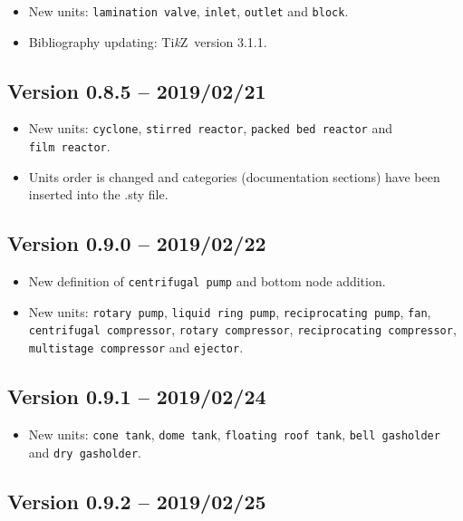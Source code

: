 \documentclass[12pt]{article}						%
\newcommand*{\chpp}[1]{\texttt{#1}}				%
\newcommand*{\TikZ}{Ti\textit{k}Z}
\begin{document}
\begin{itemize}
	\item New units: \chpp{lamination valve}, \chpp{inlet}, \chpp{outlet} and
		\chpp{block}.
	\item Bibliography updating: \TikZ\ version 3.1.1.
\end{itemize}

\subsection*{Version 0.8.5 -- 2019/02/21}

\begin{itemize}
	\item New units: \chpp{cyclone}, \chpp{stirred reactor},
		\chpp{packed bed reactor} and\\
		\chpp{film reactor}.
	\item Units order is changed and categories (documentation sections) have
		been inserted into the .sty file.
\end{itemize}

\subsection*{Version 0.9.0 -- 2019/02/22}

\begin{itemize}
	\item New definition of \chpp{centrifugal pump} and bottom node addition.
	\item New units: \chpp{rotary pump}, \chpp{liquid ring pump},
		\chpp{reciprocating pump}, \chpp{fan},\\
		\chpp{centrifugal compressor}, \chpp{rotary compressor},
		\chpp{reciprocating compressor},\\
		\chpp{multistage compressor} and \chpp{ejector}.
\end{itemize}

\subsection*{Version 0.9.1 -- 2019/02/24}

\begin{itemize}
	\item New units: \chpp{cone tank}, \chpp{dome tank},
		\chpp{floating roof tank}, \chpp{bell gasholder} and
		\chpp{dry gasholder}.
\end{itemize}

\subsection*{Version 0.9.2 -- 2019/02/25}
\end{document}
